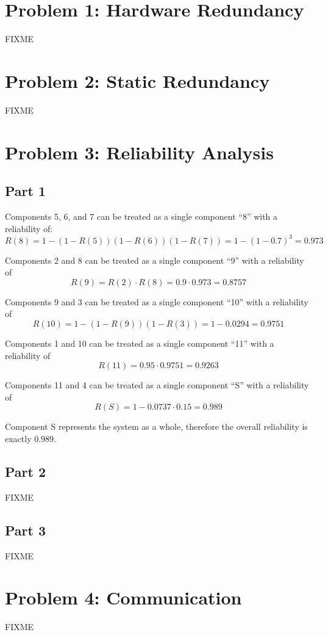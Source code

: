 \documentclass[a4paper,parskip,headheight=38pt]{scrartcl} %
\begin{document}
\section*{Problem 1: Hardware Redundancy}

FIXME


\section*{Problem 2: Static Redundancy}

FIXME


\section*{Problem 3: Reliability Analysis}

\subsection*{Part 1}

Components 5, 6, and 7 can be treated as a single component \enquote{8} with a reliability of:
\[R(8) = 1 - (1 - R(5))(1 - R(6))(1 - R(7)) = 1 - (1-0.7)^3 = 0.973\]

Components 2 and 8 can be treated as a single component \enquote{9} with a reliability of
\[R(9) = R(2) \cdot R(8) = 0.9 \cdot 0.973 = 0.8757\]

Components 9 and 3 can be treated as a single component \enquote{10} with a reliability of
\[R(10) = 1 - (1 - R(9))(1 - R(3)) = 1 - 0.0294 = 0.9751\]

Components 1 and 10 can be treated as a single component \enquote{11} with a reliability of
\[R(11) = 0.95 \cdot 0.9751 = 0.9263\]

Components 11 and 4 can be treated as a single component \enquote{S} with a reliability of
\[R(S) = 1 - 0.0737 \cdot 0.15 = 0.989\]

Component S represents the system as a whole, therefore the overall reliability is exactly $0.989$.

\subsection*{Part 2}

FIXME

\subsection*{Part 3}

FIXME


\section*{Problem 4: Communication}

FIXME
\end{document}
